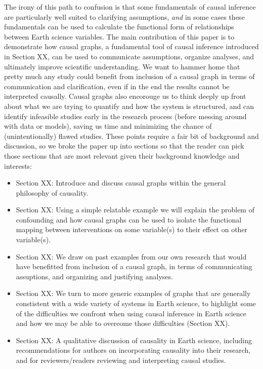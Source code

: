 \documentclass[12pt]{article}
\begin{document}
The irony of this path to confusion is that some fundamentals of
causal inference are particularly well suited to clarifying
assumptions, \textit{and} in some cases these fundamentals can be used
to calculate the functional form of relationships between Earth
science variables. The main contribution of this paper is to
demonstrate how causal graphs, a fundamental tool of causal inference
introduced in Section XX, can be used to communicate assumptions,
organize analyses, and ultimately improve scientific understanding. We
want to hammer home that pretty much any study could benefit from
inclusion of a causal graph in terms of communication and
clarification, even if in the end the results cannot be interpreted
causally. Causal graphs also encorouge us to think deeply up front
about what we are trying to quantify and how the system is structured,
and can identify infeasible studies early in the research process
(before messing around with data or models), saving us time and
minimizing the chance of (unintentionally) flawed studies. These
points require a fair bit of background and discussion, so we broke
the paper up into sections so that the reader can pick those sections
that are most relevant given their background knowledge and interests:

\begin{itemize}
\item Section XX: Introduce and discuss causal graphs within the
  general philosophy of causality.
\item Section XX: Using a simple relatable example we will explain
  the problem of confounding and how causal graphs can be used to
  isolate the functional mapping between interventions on some
  variable(s) to their effect on other variable(s).
\item Section XX: We draw on past examples from our own research that
  would have benefitted from inclusion of a causal graph, in terms of
  communicating assuptions, and organizing and justifying analyses.
\item Section XX: We turn to more generic examples of graphs that are
  generally constistent with a wide variety of systems in Earth
  science, to highlight some of the difficulties we confront when
  using causal inference in Earth science and how we may be able to
  overcome those difficulties (Section XX).
\item Section XX: A qualitative discussion of causality in Earth
  science, including recommendations for authors on incorporating
  causality into their research, and for reviewers/readers reviewing
  and interpreting causal studies.
\end{itemize}
\end{document}
